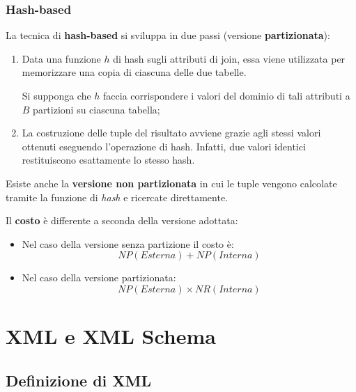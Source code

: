 \documentclass[a4paper]{article}
\begin{document}
	\subsubsection{Hash-based}
	
	La tecnica di \textcolor{Red3}{\textbf{hash-based}} si sviluppa in due passi (versione \textbf{partizionata}):
	\begin{enumerate}
		\item Data una funzione $h$ di hash sugli attributi di join, essa viene utilizzata per memorizzare una copia di ciascuna delle due tabelle.
		
		Si supponga che $h$ faccia corrispondere i valori del dominio di tali attributi a $B$ partizioni su ciascuna tabella;
		
		\item La costruzione delle tuple del risultato avviene grazie agli stessi valori ottenuti eseguendo l'operazione di hash. Infatti, due valori identici restituiscono esattamente lo stesso hash.
	\end{enumerate}
	Esiste anche la \textbf{versione non partizionata} in cui le tuple vengono calcolate tramite la funzione di \emph{hash} e ricercate direttamente.\newline
	
	\noindent
	Il \textbf{costo} è differente a seconda della versione adottata:\\
	\begin{itemize}
		\item Nel caso della versione senza partizione il costo è:
		\begin{equation*}
			NP\left(Esterna\right) + NP\left(Interna\right)
		\end{equation*}
		
		\item Nel caso della versione partizionata:
		\begin{equation*}
			NP\left(Esterna\right) \times NR\left(Interna\right)
		\end{equation*}
	\end{itemize}\newpage
	
	\section{XML e XML Schema}
	
	\subsection{Definizione di XML}
	
\end{document}
